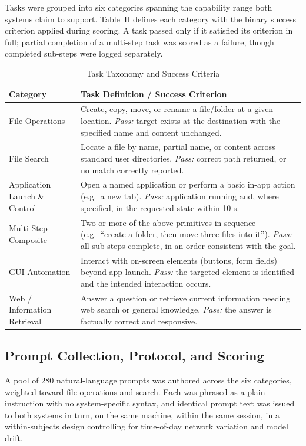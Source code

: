 \documentclass[conference]{IEEEtran}
\begin{document}
Tasks were grouped into six categories spanning the capability range both systems claim to support. Table~II defines each category with the binary success criterion applied during scoring. A task passed only if it satisfied its criterion in full; partial completion of a multi-step task was scored as a failure, though completed sub-steps were logged separately.

\begin{table}[htbp]
\caption{Task Taxonomy and Success Criteria}
\label{tab:taxonomy}
\centering
\small
\begin{tabular}{p{1.9cm}p{5.6cm}}
\toprule
\textbf{Category} & \textbf{Task Definition / Success Criterion} \\
\midrule
File Operations & Create, copy, move, or rename a file/folder at a given location. \emph{Pass:} target exists at the destination with the specified name and content unchanged. \\
File Search & Locate a file by name, partial name, or content across standard user directories. \emph{Pass:} correct path returned, or no match correctly reported. \\
Application Launch \& Control & Open a named application or perform a basic in-app action (e.g.\ a new tab). \emph{Pass:} application running and, where specified, in the requested state within 10 s. \\
Multi-Step Composite & Two or more of the above primitives in sequence (e.g.\ ``create a folder, then move three files into it''). \emph{Pass:} all sub-steps complete, in an order consistent with the goal. \\
GUI Automation & Interact with on-screen elements (buttons, form fields) beyond app launch. \emph{Pass:} the targeted element is identified and the intended interaction occurs. \\
Web / Information Retrieval & Answer a question or retrieve current information needing web search or general knowledge. \emph{Pass:} the answer is factually correct and responsive. \\
\bottomrule
\end{tabular}
\end{table}

\subsection{Prompt Collection, Protocol, and Scoring}

A pool of 280 natural-language prompts was authored across the six categories, weighted toward file operations and search. Each was phrased as a plain instruction with no system-specific syntax, and identical prompt text was issued to both systems in turn, on the same machine, within the same session, in a within-subjects design controlling for time-of-day network variation and model drift.
\end{document}
